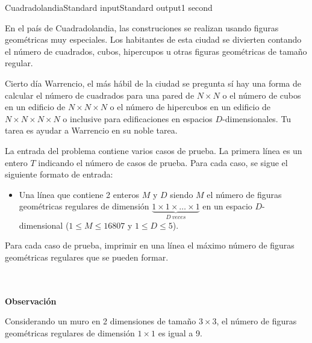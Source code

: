 \begin{problem}{Cuadradolandia}{Standard input}{Standard output}{1 second}{}

En el país de Cuadradolandia, las construciones se realizan usando figuras geométricas muy especiales. Los habitantes de esta ciudad se divierten contando el número de cuadrados, cubos, hipercupos u otras figuras geométricas de tamaño regular.

Cierto día Warrencio, el más hábil de la ciudad se pregunta sí hay una forma de calcular el número de cuadrados para una pared de $N\times N$ o el número de cubos en un edificio de $N\times N\times N$ o el número de hipercubos en un edificio de $N\times N\times N\times N$ o inclusive para edificaciones en espacios $D$-dimensionales. Tu tarea es ayudar a Warrencio en su noble tarea.

\InputFile

La entrada del problema contiene varios casos de prueba. La primera línea es un entero $T$ indicando el número de casos de prueba. Para cada caso, se sigue el siguiente formato de entrada:

\begin{itemize}
\item Una línea que contiene 2 enteros $M$ y $D$ siendo $M$ el número de figuras geométricas regulares de dimensión $\underbrace{1\times 1\times \dots \times 1}_{D~veces}$ en un espacio $D$-dimensional ($1 \leq M \leq 16807$ y $1 \leq D \leq 5$).
\end{itemize}

\OutputFile
Para cada caso de prueba, imprimir en una línea el máximo número de figuras geométricas regulares que se pueden formar. 


\Example

\begin{example}
\end{example}

~\\ \\
\textbf{\Large{\textsf{Observación}}}

Considerando un muro en 2 dimensiones de tamaño $3\times 3$, el número de figuras geométricas regulares de dimensión $1\times 1$ es igual a 9.
\end{problem}
